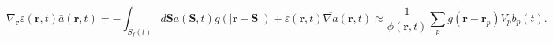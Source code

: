 \begin{equation}
\nabla_{\mathbf{r}} \varepsilon (\mathbf{r},t) \bar{a}(\mathbf{r},t) =
- \int_{S_f(t)}{d \mathbf{S} a(\mathbf{S},t) g(|\mathbf{r} - \mathbf{S}|) + 
\varepsilon (\mathbf{r},t) \overline{\nabla a}(\mathbf{r},t)}
\approx
\frac{1}{\phi(\mathbf{r},t)} \sum_{p}{g(\mathbf{r} - \mathbf{r}_p)
V_p b_p(t)}.
 \label{eq:divepsa}
\end{equation}
